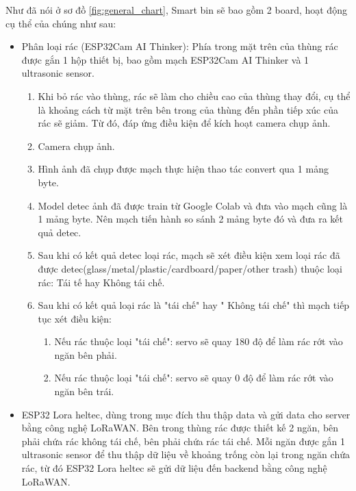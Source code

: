 Như đã nói ở sơ đồ \ref{fig:general_chart}, Smart bin sẽ bao gồm 2 board, hoạt động cụ thể của chúng như sau:
\begin{itemize}
    \item Phân loại rác (ESP32Cam AI Thinker): Phía trong mặt trên của thùng rác được gắn 1 hộp thiết bị, bao gồm mạch ESP32Cam AI Thinker và 1 ultrasonic sensor.
    \begin{enumerate}
        \item Khi bỏ rác vào thùng, rác sẽ làm cho chiều cao của thùng thay đổi, cụ thể là khoảng cách từ mặt trên bên trong của thùng đến phần tiếp xúc của rác sẽ giảm. Từ đó, đáp ứng điều kiện để kích hoạt camera chụp ảnh.
        \item Camera chụp ảnh.
        \item Hình ảnh đã chụp được mạch thực hiện thao tác convert qua 1 mảng byte.
        \item Model detec ảnh đã được train từ Google Colab và đưa vào mạch cũng là 1 mảng byte. Nên mạch tiến hành so sánh 2 mảng byte đó và đưa ra kết quả detec.
        \item Sau khi có kết quả detec loại rác, mạch sẽ xét điều kiện xem loại rác đã được detec(glass/metal/plastic/cardboard/paper/other trash) thuộc loại rác: Tái tế hay Không tái chế.
        \item Sau khi có kết quả loại rác là "tái chế" hay " Không tái chế" thì mạch tiếp tục xét điều kiện:
        \begin{enumerate}
            \item Nếu rác thuộc loại "tái chế": servo sẽ quay 180 độ để làm rác rớt vào ngăn bên phải.
            \item Nếu rác thuộc loại "tái chế": servo sẽ quay 0 độ để làm rác rớt vào ngăn bên trái.
        \end{enumerate} 
    \end{enumerate}
    \item ESP32 Lora heltec, dùng trong mục đích thu thập data và gửi data cho server bằng công nghệ LoRaWAN. Bên trong thùng rác được thiết kế 2 ngăn, bên phải chứa rác không tái chế, bên phải chứa rác tái chế. Mỗi ngăn được gắn 1 ultrasonic sensor để thu thập dữ liệu về khoảng trống còn lại trong ngăn chứa rác, từ đó ESP32 Lora heltec sẽ gửi dữ liệu đến backend bằng công nghệ LoRaWAN.
\end{itemize}

